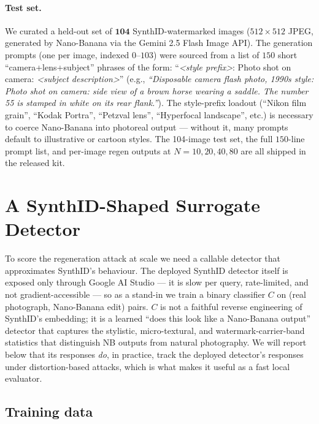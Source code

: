 \documentclass[11pt]{article}
\begin{document}
\paragraph{Test set.}
We curated a held-out set of $\mathbf{104}$ SynthID-watermarked images
($512{\times}512$ JPEG, generated by Nano-Banana via the Gemini 2.5 Flash
Image API). The generation prompts (one per image, indexed $0$--$103$)
were sourced from a list of $150$ short ``camera+lens+subject'' phrases of
the form: ``\textit{<style prefix>}: Photo shot on camera: \textit{<subject
description>}'' (e.g.,
\textit{``Disposable camera flash photo, 1990s style: Photo shot on camera:
side view of a brown horse wearing a saddle. The number 55 is stamped in
white on its rear flank.''}). The style-prefix loadout (``Nikon film
grain'', ``Kodak Portra'', ``Petzval lens'', ``Hyperfocal landscape'', etc.)
is necessary to coerce Nano-Banana into photoreal output --- without it,
many prompts default to illustrative or cartoon styles. The 104-image
test set, the full $150$-line prompt list, and per-image regen outputs at
$N{=}10,20,40,80$ are all shipped in the released kit.

\section{A SynthID-Shaped Surrogate Detector}
\label{sec:detector}

To score the regeneration attack at scale we need a callable detector
that approximates SynthID's behaviour. The deployed SynthID detector
itself is exposed only through Google AI Studio --- it is slow per
query, rate-limited, and not gradient-accessible --- so as a stand-in
we train a binary classifier $C$ on (real photograph, Nano-Banana edit)
pairs. $C$ is not a faithful reverse engineering of SynthID's
embedding; it is a learned ``does this look like a Nano-Banana
output'' detector that captures the stylistic, micro-textural, and
watermark-carrier-band statistics that distinguish NB outputs from
natural photography. We will report below that its responses
\emph{do}, in practice, track the deployed detector's responses under
distortion-based attacks, which is what makes it useful as a fast
local evaluator.

\subsection{Training data}
\end{document}
